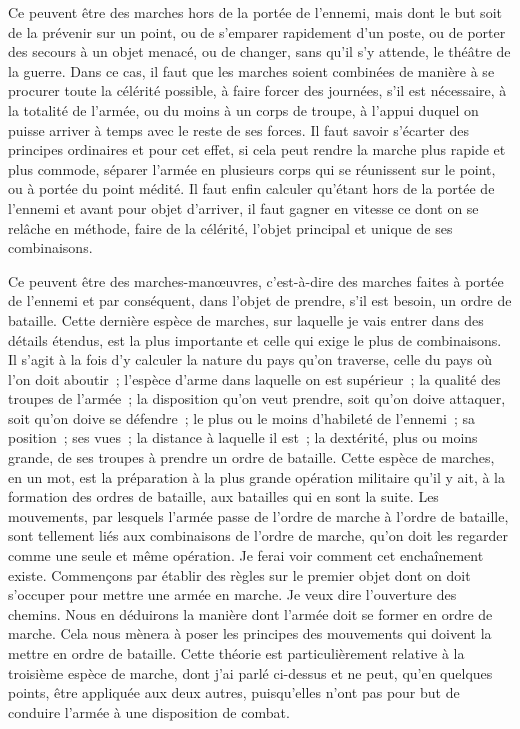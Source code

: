 \documentclass[french,twoside]{book} %
\begin{document}
Ce peuvent être des marches hors de la portée de l’ennemi, mais dont le but soit de la prévenir sur un point, ou de s’emparer rapidement d’un poste, ou de porter des secours à un objet menacé, ou de changer, sans qu’il s’y attende, le théâtre de la guerre. Dans ce cas, il faut que les marches soient combinées de manière à se procurer toute la célérité possible, à faire forcer des journées, s’il est nécessaire, à la totalité de l’armée, ou du moins à un corps de troupe, à l’appui duquel on puisse arriver à temps avec le reste de ses forces. Il faut savoir s’écarter des principes ordinaires et pour cet effet, si cela peut rendre la marche plus rapide et plus commode, séparer l’armée en plusieurs corps qui se réunissent sur le point, ou à portée du point médité. Il faut enfin calculer qu’étant hors de la portée de l’ennemi et avant pour objet d’arriver, il faut gagner en vitesse ce dont on se relâche en méthode, faire de la célérité, l’objet principal et unique de ses combinaisons.\par
Ce peuvent être des marches-manœuvres, c’est-à-dire des marches faites à portée de l’ennemi et par conséquent, dans l’objet de prendre, s’il est besoin, un ordre de bataille. Cette dernière espèce de marches, sur laquelle je vais entrer dans des détails étendus, est la plus importante et celle qui exige le plus de combinaisons. Il s’agit à la fois d’y calculer la nature du pays qu’on traverse, celle du pays où l’on doit aboutir ; l’espèce d’arme dans laquelle on est supérieur ; la qualité des troupes de l’armée ; la disposition qu’on veut prendre, soit qu’on doive attaquer, soit qu’on doive se défendre ; le plus ou le moins d’habileté de l’ennemi ; sa position ; ses vues ; la distance à laquelle il est ; la dextérité, plus ou moins grande, de ses troupes à prendre un ordre de bataille. Cette espèce de marches, en un mot, est la préparation à la plus grande opération militaire qu’il y ait, à la formation des ordres de bataille, aux batailles qui en sont la suite. Les mouvements, par lesquels l’armée passe de l’ordre de marche à l’ordre de bataille, sont tellement liés aux combinaisons de l’ordre de marche, qu’on doit les regarder comme une seule et même opération. Je ferai voir comment cet enchaînement existe. Commençons par établir des règles sur le premier objet dont on doit s’occuper pour mettre une armée en marche. Je veux dire l’ouverture des chemins. Nous en déduirons la manière dont l’armée doit se former en ordre de marche. Cela nous mènera à poser les principes des mouvements qui doivent la mettre en ordre de bataille. Cette théorie est particulièrement relative à la troisième espèce de marche, dont j’ai parlé ci-dessus et ne peut, qu’en quelques points, être appliquée aux deux autres, puisqu’elles n’ont pas pour but de conduire l’armée à une disposition de combat.
\end{document}
